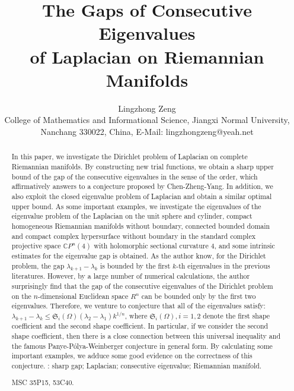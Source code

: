 \documentclass[12pt]{article}
\numberwithin{equation}{section}
\begin{document}
\title{The  Gaps  of  Consecutive Eigenvalues \\ of Laplacian on  Riemannian Manifolds}
\author{Lingzhong Zeng
\\ \small College of Mathematics and Informational Science,
Jiangxi Normal University,
\\
\small Nanchang 330022, China, E-Mail: lingzhongzeng@yeah.net
}
\date{}

\maketitle


\begin{abstract}\noindent In this paper, we investigate the Dirichlet problem of Laplacian on complete Riemannian manifolds.  By constructing new trial functions,
we obtain a sharp upper bound of the gap of the consecutive eigenvalues  in the sense of the order, which  affirmatively answers to a
conjecture proposed by Chen-Zheng-Yang. In addition, we also exploit the closed eigenvalue problem of
Laplacian and obtain a similar optimal upper bound. As some important examples,  we investigate the eigenvalues of the eigenvalue problem of the Laplacian
 on  the unit sphere and cylinder,
compact homogeneous Riemannian manifolds without boundary, connected bounded domain  and   compact complex hypersurface without boundary in the standard
complex projective space $\mathbb{C}P^{n}(4)$ with holomorphic sectional curvature $4$,
and some intrinsic estimates for the eigenvalue gap is obtained. As the author know, for the Dirichlet problem, the gap  $\lambda_{k+1}-\lambda_{k}$ is
bounded by the first $k$-th eigenvalues in the previous literatures. However, by a large number of numerical calculations,
the author surprisingly find that the gap of the consecutive eigenvalues of the Dirichlet problem on the $n$-dimensional Euclidean space $R^{n}$
can be bounded only by the first two eigenvalues. Therefore, we venture to conjecture that all of the eigenvalues  satisfy:
$\lambda_{k+1}-\lambda_{k}\leq \mathfrak{S}_{i}(\Omega)(\lambda_{2}-\lambda_{1})k^{1/n}$, where $\mathfrak{S}_{i}(\Omega),i=1,2$ denote the first shape coefficient and the second shape coefficient.  In particular, if we consider the second shape coefficient, then there is a
close connection between this universal inequality and the famous Panye-P\'{o}lya-Weinberger conjecture in general form. By calculating  some important examples, we adduce some good
evidence on the correctness of this conjecture.
\vskip3mm
:
sharp gap; Laplacian;
consecutive eigenvalue; Riemannian manifold.

\vskip3mm
 MSC 35P15, 53C40.
\end{abstract}
\end{document}
